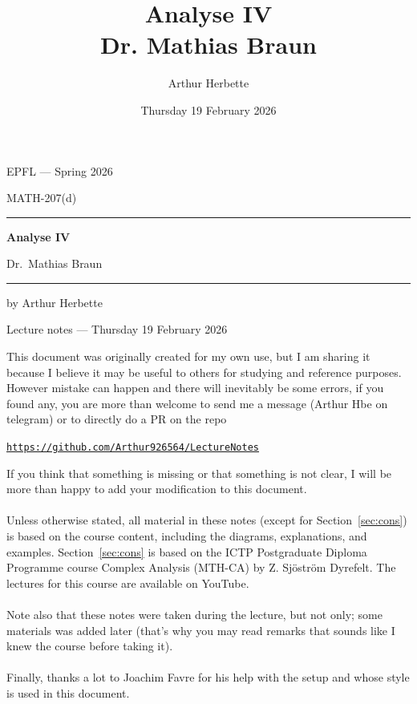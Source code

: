 \documentclass[a4paper]{book}
\title{Analyse IV \\ Dr. Mathias Braun}
\author{Arthur Herbette}
\date{Thursday 19 February 2026}
\begin{document}
\begin{titlepage}
    \centering
    \vspace*{2cm}
    
    {\large EPFL --- Spring 2026\par}
    \vspace{0.5cm}
    {\small MATH-207(d)\par}
    
    \vspace{2cm}
    \rule{\linewidth}{0.4pt}
    \vspace{0.4cm}
    
    {\huge\bfseries Analyse IV\par}
    \vspace{0.3cm}
    {\large Dr.\ Mathias Braun\par}
    
    \vspace{0.4cm}
    \rule{\linewidth}{0.4pt}
    
    \vfill
    
    {by Arthur Herbette\par}
    \vspace{0.3cm}
    {\small Lecture notes --- Thursday 19 February 2026\par}
    
    \vspace{2cm}
\end{titlepage}
This document was originally created for my own use, but I am sharing it because I believe it may be useful to others for studying and reference purposes. However mistake can happen and there will inevitably be some errors, if you found any, you are more than welcome to send me a message (Arthur Hbe on telegram) or to directly do a PR on the repo 
\begin{center}
	\texttt{\href{https://github.com/Arthur926564/LectureNotes}{https://github.com/Arthur926564/LectureNotes}}
\end{center}

If you think that something is missing or that something is not clear, I will be more than happy to add your modification to this document.\\
$ $\\
Unless otherwise stated, all material in these notes (except for Section~\ref{sec:cons}) is based on the course content, including the diagrams, explanations, and examples. Section~\ref{sec:cons} is based on the ICTP Postgraduate Diploma Programme course Complex Analysis (MTH-CA) by Z. Sjöström Dyrefelt. The lectures for this course are available on YouTube.\\
$ $\\
Note also that these notes were taken during the lecture, but not only; some materials was added later (that's why you may read remarks that sounds like I knew the course before taking it).\\
$ $\\
Finally, thanks a lot to Joachim Favre for his help with the setup and whose style is used in this document.
\end{document}
